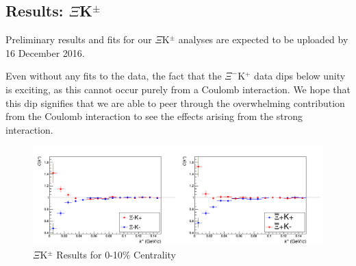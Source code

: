 \documentclass[../AnalysisNoteJBuxton.tex]{subfiles}
\begin{document}
\subsection{Results: \texorpdfstring{$\Xi$K$^{\pm}$}{TEXT}}
\label{ResultsXiK}

Preliminary results and fits for our $\Xi$K$^{\pm}$ analyses are expected to be uploaded by 16 December 2016.

Even without any fits to the data, the fact that the $\Xi^{-}$K$^{+}$ data dips below unity is exciting, as this cannot occur purely from a Coulomb interaction.  We hope that this dip signifies that we are able to peer through the overwhelming contribution from the Coulomb interaction to see the effects arising from the strong interaction.

\begin{figure}[h]
  \centering
  \includegraphics[width=\textwidth]{7_ResultsAndDiscussion/Figures/cXicKchKStarCfs.png}
  \caption[$\Xi$K$^{\pm}$ Results]{$\Xi$K$^{\pm}$ Results for 0-10\% Centrality}
  \label{fig:XiKchwConjResults}
\end{figure}
\end{document}

